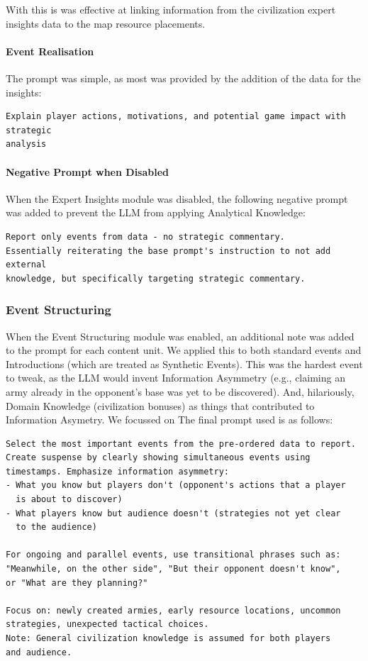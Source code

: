 With this is was effective at linking information from the civilization expert insights data to the map resource placements.

\paragraph{Event Realisation} The prompt was simple, as most was provided by the addition of the data for the insights:
\begin{verbatim}
Explain player actions, motivations, and potential game impact with strategic
analysis
\end{verbatim}

\paragraph{Negative Prompt when Disabled} When the Expert Insights module was disabled, the following negative prompt was added to prevent the LLM from applying Analytical Knowledge:
\begin{verbatim}
Report only events from data - no strategic commentary.
Essentially reiterating the base prompt's instruction to not add external
knowledge, but specifically targeting strategic commentary.
\end{verbatim}

\subsubsection{Event Structuring} When the Event Structuring module was enabled, an additional note was added to the prompt for each content unit. We applied this to both standard events and Introductions (which are treated as Synthetic Events). This was the hardest event to tweak, as the LLM would invent Information Asymmetry (e.g., claiming an army already in the opponent's base was yet to be discovered). And, hilariously, Domain Knowledge (civilization bonuses) as things that contributed to Information Asymetry. We focussed on  The final prompt used is as follows:
\begin{verbatim}
Select the most important events from the pre-ordered data to report.
Create suspense by clearly showing simultaneous events using
timestamps. Emphasize information asymmetry:
- What you know but players don't (opponent's actions that a player
  is about to discover)
- What players know but audience doesn't (strategies not yet clear
  to the audience)

For ongoing and parallel events, use transitional phrases such as:
"Meanwhile, on the other side", "But their opponent doesn't know",
or "What are they planning?"

Focus on: newly created armies, early resource locations, uncommon
strategies, unexpected tactical choices.
Note: General civilization knowledge is assumed for both players
and audience.
\end{verbatim}

